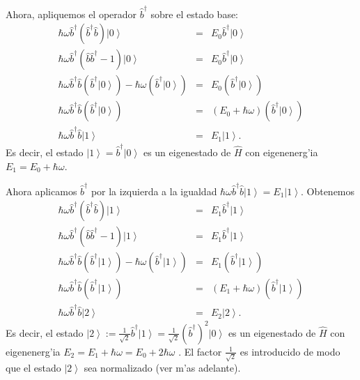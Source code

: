 Ahora, apliquemos el operador $\hat{b}^{\dag}$ sobre el estado base:%
\begin{eqnarray}
\hbar\omega\hat{b}^{\dag}\left( \hat{b}^{\dagger}\hat{b}\right) \left|
0\right> & = &E_{0}\hat{b}^{\dag}\left| 0\right> \\
\hbar\omega\hat{b}^{\dag}\left( \hat{b}\hat{b}^{\dagger}-1\right) \left|
0\right> & = &E_{0}\hat{b}^{\dag}\left| 0\right> \\
\hbar\omega\hat{b}^{\dag}\hat{b}\left( \hat{b}^{\dagger}\left|
0\right> \right) -\hbar\omega\left( \hat{b}^{\dag}\left|
0\right> \right) & = &E_{0}\left( \hat{b}^{\dag}\left|
0\right> \right) \\
\hbar\omega\hat{b}^{\dag}\hat{b}\left( \hat{b}^{\dagger}\left|
0\right> \right) & = &\left( E_{0}+\hbar\omega\right) \left( \hat
{b}^{\dag}\left| 0\right> \right) \\
\hbar\omega\hat{b}^{\dag}\hat{b}\left| 1\right> & = &E_{1}\left|
1\right> .
\end{eqnarray}
Es decir, el estado $\left| 1\right> =\hat{b}^{\dagger}\left|
0\right> $ es un eigenestado de $\hat{H}$ con eigenenerg'ia
$E_{1}=E_{0}+\hbar\omega$.

Ahora aplicamos $\hat{b}^{\dag}$ por la izquierda a la igualdad $\hbar\omega\hat{b}^{\dag}\hat{b}\left| 1\right>  =E_{1}\left|
1\right>$. Obtenemos
\begin{eqnarray}
\hbar\omega\hat{b}^{\dagger}\left( \hat{b}^{\dag}\hat{b}\right) \left|
1\right> & = &E_{1}\hat{b}^{\dagger}\left| 1\right> \\
\hbar\omega\hat{b}^{\dagger}\left( \hat{b}\hat{b}^{\dagger}-1\right)
\left| 1\right> & = &E_{1}\hat{b}^{\dagger}\left| 1\right>
\\
\hbar\omega\hat{b}^{\dagger}\hat{b}\left( \hat{b}^{\dagger}\left|
1\right> \right) -\hbar\omega\left( \hat{b}^{\dagger}\left|
1\right> \right) & = &E_{1}\left( \hat{b}^{\dagger}\left|
1\right> \right) \\
\hbar\omega\hat{b}^{\dagger}\hat{b}\left( \hat{b}^{\dagger}\left|
1\right> \right) & = &\left( E_{1}+\hbar\omega\right) \left( \hat
{b}^{\dagger}\left| 1\right> \right) \\
\hbar\omega\hat{b}^{\dagger}\hat{b}\left| 2\right> & = &E_{2}%
\left| 2\right> .
\end{eqnarray}
Es decir, el estado $\left| 2\right> :=\frac{1}{\sqrt{2}}\hat{b}^{\dagger}\left|
1\right> =\frac{1}{\sqrt{2}}\left( \hat{b}^{\dagger}\right)
^{2}\left| 0\right> $ es un eigenestado de $\hat{H}$ con
eigenenerg'ia $E_{2}=E_{1}+\hbar\omega=E_{0}+2\hbar\omega$ . El factor $\frac{1}{\sqrt{2}}$ es introducido de modo que el estado $\left| 2\right>$ sea normalizado (ver m'as adelante).

